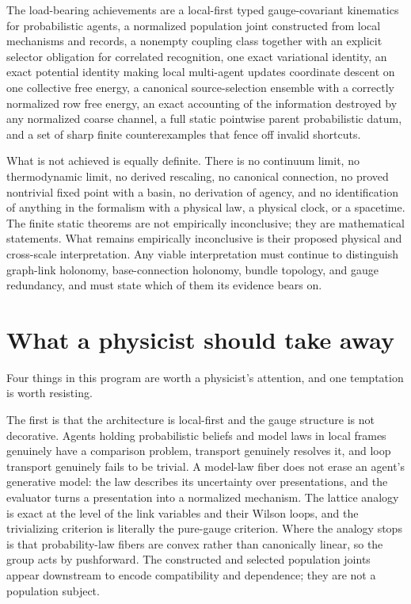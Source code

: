 \documentclass[11pt,letterpaper]{article}
\begin{document}
\begin{provedbox}
The load-bearing achievements are a local-first typed gauge-covariant kinematics for probabilistic agents, a normalized population joint constructed from local mechanisms and records, a nonempty coupling class together with an explicit selector obligation for correlated recognition, one exact variational identity, an exact potential identity making local multi-agent updates coordinate descent on one collective free energy, a canonical source-selection ensemble with a correctly normalized row free energy, an exact accounting of the information destroyed by any normalized coarse channel, a full static pointwise parent probabilistic datum, and a set of sharp finite counterexamples that fence off invalid shortcuts.
\end{provedbox}

\begin{boundarybox}
What is not achieved is equally definite. There is no continuum limit, no thermodynamic limit, no derived rescaling, no canonical connection, no proved nontrivial fixed point with a basin, no derivation of agency, and no identification of anything in the formalism with a physical law, a physical clock, or a spacetime. The finite static theorems are not empirically inconclusive; they are mathematical statements. What remains empirically inconclusive is their proposed physical and cross-scale interpretation. Any viable interpretation must continue to distinguish graph-link holonomy, base-connection holonomy, bundle topology, and gauge redundancy, and must state which of them its evidence bears on.
\end{boundarybox}

\section{What a physicist should take away}

Four things in this program are worth a physicist's attention, and one temptation is worth resisting.

The first is that the architecture is local-first and the gauge structure is not decorative. Agents holding probabilistic beliefs and model laws in local frames genuinely have a comparison problem, transport genuinely resolves it, and loop transport genuinely fails to be trivial. A model-law fiber does not erase an agent's generative model: the law describes its uncertainty over presentations, and the evaluator turns a presentation into a normalized mechanism. The lattice analogy is exact at the level of the link variables and their Wilson loops, and the trivializing criterion is literally the pure-gauge criterion. Where the analogy stops is that probability-law fibers are convex rather than canonically linear, so the group acts by pushforward. The constructed and selected population joints appear downstream to encode compatibility and dependence; they are not a population subject.
\end{document}
